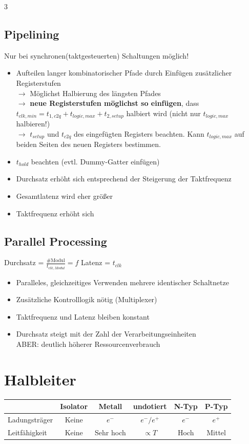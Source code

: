 \documentclass[6pt,a4paper]{scrartcl}
\newcommand{\ra}[0]{\ensuremath{\rightarrow}} 									%
\begin{document}
\begin{multicols*}{3}
\begin{minipage}{\columnwidth}
		\subsection{Pipelining} %
		Nur bei synchronen(taktgesteuerten) Schaltungen möglich!
		\begin{itemize} \itemsep0pt
			\item Aufteilen langer kombinatorischer Pfade durch Einfügen zusätzlicher Registerstufen\\
			      $\ra$ Möglichst Halbierung des längsten Pfades\\
			      $\ra$ \textbf{neue Registerstufen möglichst so einfügen}, dass $t_{clk,min}=t_{1,c2q}+t_{logic,max}+t_{2,setup}$ halbiert wird (nicht nur $t_{logic,max}$ halbieren!)\\
			      $\ra$ $t_{setup}$ und $t_{c2q}$ des eingefügten Registers beachten. Kann $t_{logic,max}$ auf beiden Seiten des neuen Registers bestimmen.
			\item $t_{hold}$ beachten (evtl. Dummy-Gatter einfügen)
			\item Durchsatz erhöht sich entsprechend der Steigerung der Taktfrequenz
			\item Gesamtlatenz wird eher größer
			\item Taktfrequenz erhöht sich
		\end{itemize}
	\end{minipage}

	\subsection{Parallel Processing} %

	Durchsatz = $\frac{\#\text{Modul}}{t_{clk,Modul}} = f$ \qquad \quad Latenz = $t_{clk}$
	\begin{itemize} \itemsep0pt
		\item Paralleles, gleichzeitiges Verwenden mehrere identischer Schaltnetze
		\item Zusätzliche Kontrolllogik nötig (Multiplexer)
		\item Taktfrequenz und Latenz bleiben konstant
		\item Durchsatz steigt mit der Zahl der Verarbeitungseinheiten \\
		      ABER: deutlich höherer Ressourcenverbrauch
	\end{itemize}


	\section{Halbleiter}
	\begin{tabular}{l|c|c|c|c|c}
		              & Isolator & Metall    & undotiert   & N-Typ & P-Typ  \\ \hline
		Ladungsträger & Keine    & $e^-$     & $e^- / e^+$ & $e^-$ & $e^+$  \\
		Leitfähigkeit & Keine    & Sehr hoch & $\propto T$ & Hoch  & Mittel \\
	\end{tabular}


\end{multicols*}
\end{document}

